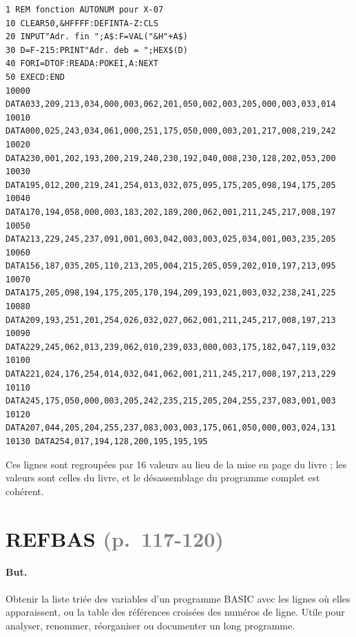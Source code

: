 \documentclass[a4paper,10pt]{article}
\newcommand{\pg}[1]{\texorpdfstring{\textcolor{gray}{\small(p.~#1)}}{}}
\begin{document}
\begin{verbatim}
1 REM fonction AUTONUM pour X-07
10 CLEAR50,&HFFFF:DEFINTA-Z:CLS
20 INPUT"Adr. fin ";A$:F=VAL("&H"+A$)
30 D=F-215:PRINT"Adr. deb = ";HEX$(D)
40 FORI=DTOF:READA:POKEI,A:NEXT
50 EXECD:END
10000 DATA033,209,213,034,000,003,062,201,050,002,003,205,000,003,033,014
10010 DATA000,025,243,034,061,000,251,175,050,000,003,201,217,008,219,242
10020 DATA230,001,202,193,200,219,240,230,192,040,008,230,128,202,053,200
10030 DATA195,012,200,219,241,254,013,032,075,095,175,205,098,194,175,205
10040 DATA170,194,058,000,003,183,202,189,200,062,001,211,245,217,008,197
10050 DATA213,229,245,237,091,001,003,042,003,003,025,034,001,003,235,205
10060 DATA156,187,035,205,110,213,205,004,215,205,059,202,010,197,213,095
10070 DATA175,205,098,194,175,205,170,194,209,193,021,003,032,238,241,225
10080 DATA209,193,251,201,254,026,032,027,062,001,211,245,217,008,197,213
10090 DATA229,245,062,013,239,062,010,239,033,000,003,175,182,047,119,032
10100 DATA221,024,176,254,014,032,041,062,001,211,245,217,008,197,213,229
10110 DATA245,175,050,000,003,205,242,235,215,205,204,255,237,083,001,003
10120 DATA207,044,205,204,255,237,083,003,003,175,061,050,000,003,024,131
10130 DATA254,017,194,128,200,195,195,195
\end{verbatim}
Ces lignes sont regroupées par 16 valeurs au lieu de la mise en page du
livre ; les valeurs sont celles du livre, et le désassemblage du programme
complet est cohérent.

\section{REFBAS \pg{117-120}}\label{sec:refbas}

\paragraph{But.} Obtenir la liste triée des variables d'un programme BASIC
avec les lignes où elles apparaissent, ou la table des références croisées
des numéros de ligne. Utile pour analyser, renommer, réorganiser ou
documenter un long programme.
\end{document}
